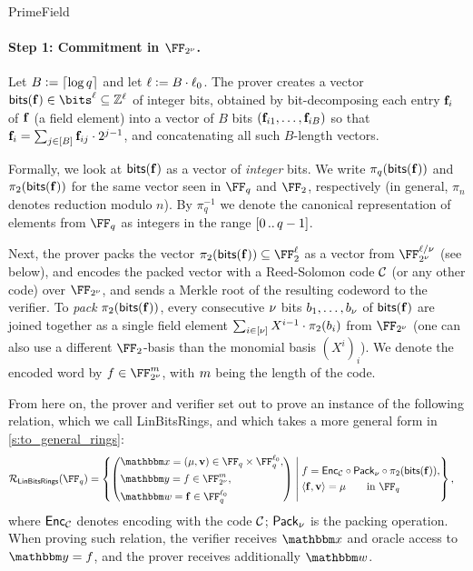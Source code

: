 \begin{lncsmove}{PrimeField}
 \paragraph{Step 1: Commitment in $\comfield$.} Let $B{\;\vcentcolon=\;} \lceil \log q\rceil$ and let $\ell{\;\vcentcolon=\;} B\cdot \ell_0$. The prover creates a vector $\bitstext(\bff) \in \bits^{\codedim} \subseteq \ZZ^{\codedim}$ of integer bits, obtained by bit-decomposing each entry $\mathbf{f}_i$ of $\mathbf{f}$ (a field element) into a vector of $B$ bits $(\mathbf{f}_{i1}, \ldots, \mathbf{f}_{iB})$ so that $\mathbf{f}_i = \sum_{j\in [B]} \mathbf{f}_{ij}\cdot 2^{j-1}$, and concatenating all such $B$-length vectors.

 Formally, we look at $\mathsf{bits}(\mathbf{f})$ as a vector of \emph{integer} bits. We write $\pi_q(\mathsf{bits}(\mathbf{f}))$ and $\pi_2(\mathsf{bits}(\mathbf{f}))$ for the same vector seen in $\FF_q$ and $\FF_2$, respectively (in general, $\pi_n$ denotes reduction modulo $n$).  By $\pi_q^{-1}$ we denote the canonical representation of elements from $\FF_q$ as integers in the range $[0 \, .. \, q-1]$.

     Next, the prover packs the vector  $\pi_2(\bitstext(\bff)) \subseteq  \FF_2^{\codedim}$ as a vector from $\comfield^{\codedim/\comfieldexp}$ (see below), and encodes the packed vector with a Reed-Solomon code $\mathcal{C}$ (or any other code) over $\comfield$, and sends a Merkle root of the resulting codeword to the verifier.   To \emph{pack} $\pi_2(\mathsf{bits}(\mathbf{f}))$, every consecutive $\nu$ bits $b_1, \ldots, b_\nu$ of $\mathsf{bits}(\mathbf{f})$ are joined together as a single field element $\sum_{i\in [\nu]} X^{i-1}\cdot \pi_2(b_i)$ from $\comfield$ (one can also use a different $\FF_2$-basis than the monomial basis $(X^i)_i$). We denote the encoded word by $f\in \comfield^{\codelength}$, with $m$ being the length of the code.
     
    From here on, the prover and verifier set out to prove an instance of the following relation, which we call LinBitsRings, and which takes a more general form in \cref{s:to_general_rings}:
%
    \begin{align*}
 &\LinModFieldBin(\FF_q) = \left\{ \left(\begin{aligned} &\inp=(\mu, \vv)\in \FF_q  \times \FF_q^{ \codedim_0}, \\
 &\oracle = f \in \comfield^{\codelength}, \\ &\wit= \bff\in \FF_q^{\codedim_0}\end{aligned}\right) \;\middle|\;  \begin{aligned}  
 &f = \Enc_{\cC}\circ \pack\circ\pi_2(\bitstext(\bff)),\\
 &\langle \bff, \vv \rangle = \mu  \qquad  \text{in } \FF_q
 \end{aligned} \right\},
\end{align*}
    where $\mathsf{Enc}_{\mathcal{C}}$ denotes encoding with the code $\mathcal{C}$; $\mathsf{Pack}_\nu$ is the packing operation. When proving such relation, the verifier receives $\inp$ and oracle access to $\oracle=f$, and the prover receives additionally $\wit$.


\end{lncsmove}
